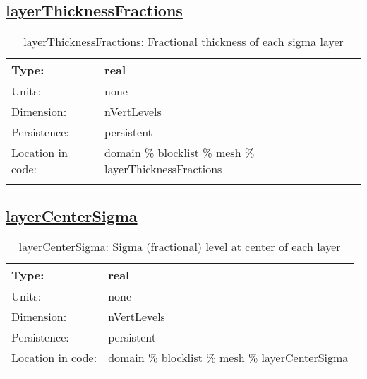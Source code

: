 \subsection[layerThicknessFractions]{\hyperref[sec:var_tab_mesh]{layerThicknessFractions}}
\label{subsec:var_sec_mesh_layerThicknessFractions}
\begin{center}
\begin{longtable}{| p{2.0in} | p{4.0in} |}
        \hline 
        Type: & real \\
        \hline 
        Units: & \si{none} \\
        \hline 
        Dimension: & nVertLevels \\
        \hline 
        Persistence: & persistent \\
        \hline 
         Location in code: & domain \% blocklist \% mesh \% layerThicknessFractions \\
         \hline 
    \caption{layerThicknessFractions: Fractional thickness of each sigma layer}
\end{longtable}
\end{center}
\subsection[layerCenterSigma]{\hyperref[sec:var_tab_mesh]{layerCenterSigma}}
\label{subsec:var_sec_mesh_layerCenterSigma}
\begin{center}
\begin{longtable}{| p{2.0in} | p{4.0in} |}
        \hline 
        Type: & real \\
        \hline 
        Units: & \si{none} \\
        \hline 
        Dimension: & nVertLevels \\
        \hline 
        Persistence: & persistent \\
        \hline 
         Location in code: & domain \% blocklist \% mesh \% layerCenterSigma \\
         \hline 
    \caption{layerCenterSigma: Sigma (fractional) level at center of each layer}
\end{longtable}
\end{center}

